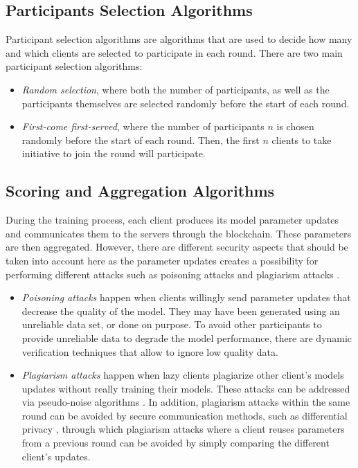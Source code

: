 \subsection{Participants Selection Algorithms}

Participant selection algorithms are algorithms that are used to decide how many and which clients are selected to participate in each round. There are two main participant selection algorithms:

\begin{itemize}
    \item \textit{Random selection}, where both the number of participants, as well as the participants themselves are selected randomly before the start of each round.
    
    \item \textit{First-come first-served}, where the number of participants $n$ is chosen randomly before the start of each round. Then, the first $n$ clients to take initiative to join the round will participate.
\end{itemize}

\subsection{Scoring and Aggregation Algorithms}
\label{background:scoring}

During the training process, each client produces its model parameter updates and communicates them to the servers through the blockchain. These parameters are then aggregated. However, there are different security aspects that should be taken into account here as the parameter updates creates a possibility for performing different attacks such as poisoning attacks \cite{9134967} and plagiarism attacks \cite{10.48550/arxiv.2009.09338}.

\begin{itemize}
    \item \textit{Poisoning attacks} happen when clients willingly send parameter updates that decrease the quality of the model. They may have been generated using an unreliable data set, or done on purpose. To avoid other participants to provide unreliable data to degrade the model performance, there are dynamic verification techniques \cite{10.48550/arxiv.2110.02182, 10.48550/arxiv.2104.10501} that allow to ignore low quality data.
    
    \item \textit{Plagiarism attacks} happen when lazy clients plagiarize other client's models updates without really training their models. These attacks can be addressed via pseudo-noise algorithms \cite{9403374}. In addition, plagiarism attacks within the same round can be avoided by secure communication methods, such as differential privacy \cite{10.48550/arxiv.2009.09338}, through which plagiarism attacks where a client reuses parameters from a previous round can be avoided by simply comparing the different client's updates.
\end{itemize}


